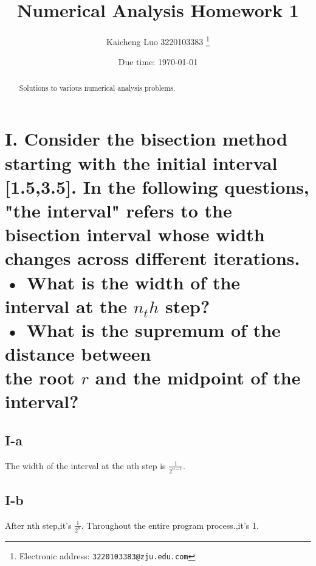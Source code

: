 \documentclass[a4paper]{article}
\begin{document}
\title{Numerical Analysis Homework 1}

\author{Kaicheng Luo 3220103383
  \thanks{Electronic address: \texttt{3220103383@zju.edu.com}}}

\date{Due time: \today}

\maketitle

\begin{abstract}
    Solutions to various numerical analysis problems.
\end{abstract}

\section*{I. Consider the bisection method starting with the initial interval [1.5,3.5]. In the following questions, "the interval" refers to the bisection interval whose width changes across different iterations.\\
 • What is the width of the interval at the \(n_th\) step?\\
 • What is the supremum of the distance between\\
 the root \( r \) and the midpoint of the interval?}

\subsection*{I-a}
The width of the interval at the nth step is \( \frac{1}{2^{n-1}} \).

\subsection*{I-b}
After nth step,it's \(\frac{1}{2^n}\).
Throughout the entire program process.,it's 1.
 
\end{document}
